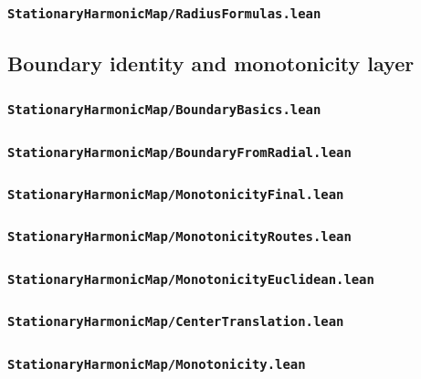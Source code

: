 \documentclass[reqno,11pt]{amsart}
\numberwithin{equation}{section}
\theoremstyle{plain}
\theoremstyle{definition}
\theoremstyle{remark}
\begin{document}
\subsubsection*{\texttt{StationaryHarmonicMap/RadiusFormulas.lean}}

\subsection{Boundary identity and monotonicity layer}

\subsubsection*{\texttt{StationaryHarmonicMap/BoundaryBasics.lean}}
\subsubsection*{\texttt{StationaryHarmonicMap/BoundaryFromRadial.lean}}
\subsubsection*{\texttt{StationaryHarmonicMap/MonotonicityFinal.lean}}
\subsubsection*{\texttt{StationaryHarmonicMap/MonotonicityRoutes.lean}}
\subsubsection*{\texttt{StationaryHarmonicMap/MonotonicityEuclidean.lean}}
\subsubsection*{\texttt{StationaryHarmonicMap/CenterTranslation.lean}}
\subsubsection*{\texttt{StationaryHarmonicMap/Monotonicity.lean}}
\end{document}
